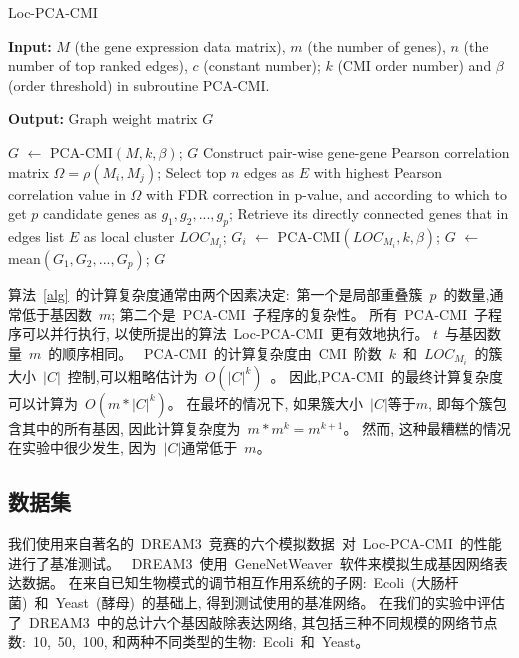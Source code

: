 \begin{algorithm}[!htbp]
    \caption{Loc-PCA-CMI} %
    \label{alg}
    {\bf Input:} %
    $M$ (the gene expression data matrix), $m$ (the number of genes), $n$ (the number of top ranked edges), $c$ (constant number); $k$ (CMI order number) and $\beta$ (order threshold) in subroutine PCA-CMI.
    
    {\bf Output:} %
    Graph weight matrix $G$ 
    \begin{algorithmic}[1]
    \State $G$ $\leftarrow$ PCA-CMI$(M, k, \beta)$;
    \State \Return $G$
    \Else
    \State Construct pair-wise gene-gene Pearson correlation matrix $\Omega = \rho(M_i, M_j)$;
    \State Select top $n$ edges as $E$ with highest Pearson correlation value in $\Omega$ with FDR correction in p-value, and according to which to get 
    $p$ candidate genes as $g_1,g_2,...,g_{p}$;
      \State Retrieve its directly connected genes that in edges list $E$ as local cluster $LOC_{M_i}$;
    \EndFor
      \State $G_{i}$ $\leftarrow$ PCA-CMI$(LOC_{M_i}, k, \beta)$;
    \EndFor
    \State $G$ $\leftarrow$ mean$(G_{1},G_{2},...,G_{p})$;
    \State \Return $G$
    \EndIf
    \end{algorithmic}
\end{algorithm}

算法~\ref{alg}~的计算复杂度通常由两个因素决定:~第一个是局部重叠簇~$p$~的数量,通常低于基因数~$m$; 第二个是~PCA-CMI~子程序的复杂性。
所有~PCA-CMI~子程序可以并行执行, 以使所提出的算法~Loc-PCA-CMI~更有效地执行。
$t$~与基因数量~$m$~的顺序相同。
~PCA-CMI~的计算复杂度由~CMI~阶数~$k$~和~$LOC_{M_i}$~的簇大小~$|C|$~控制,可以粗略估计为~$O(|C|^k)$~。
因此,PCA-CMI~的最终计算复杂度可以计算为~$O(m *|C|^k)$。
在最坏的情况下, 如果簇大小~$|C|$等于$m$, 即每个簇包含其中的所有基因, 因此计算复杂度为~$m*m^k = m^{k+1}$。 
然而, 这种最糟糕的情况在实验中很少发生, 因为~$|C|$通常低于~$m$。

\subsection{数据集}

我们使用来自著名的~DREAM3~竞赛的六个模拟数据~\cite{schaffter2011genenetweaver}对~Loc-PCA-CMI~的性能进行了基准测试。
~DREAM3~使用~GeneNetWeaver~软件来模拟生成基因网络表达数据。
在来自已知生物模式的调节相互作用系统的子网:~Ecoli~(大肠杆菌)~和~Yeast~(酵母)~的基础上,
得到测试使用的基准网络。 
在我们的实验中评估了~DREAM3~中的总计六个基因敲除表达网络,
其包括三种不同规模的网络节点数:~10,~50,~100, 和两种不同类型的生物:~Ecoli~和~Yeast。

